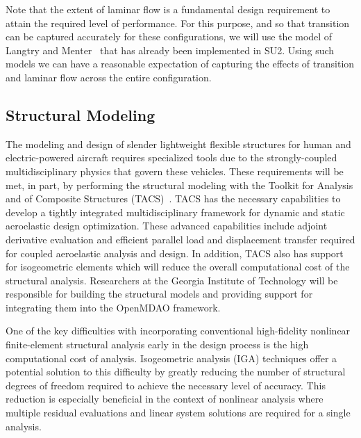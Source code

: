 \documentclass[]{aiaa-tc}
\begin{document}
    Note that the extent of laminar flow is a fundamental design requirement to attain the required level of performance.  For this purpose, and so that transition can be captured accurately for these configurations, we will use the model of Langtry and Menter~\cite{Langtry:Correlation} that has already been implemented in SU2.  Using such models we can have a reasonable expectation of capturing the effects of transition and laminar flow across the entire configuration.          

 
    
        \subsection{Structural Modeling}

The modeling and design of slender lightweight flexible structures for
human and electric-powered aircraft requires specialized tools due to
the strongly-coupled multidisciplinary physics that govern these
vehicles. These requirements will be met, in part, by performing the
structural modeling with the Toolkit for Analysis and of Composite
Structures (TACS)~\cite{Kennedy:2014:TACS,
  Kennedy:2014:tacs-tripan}. TACS has the necessary capabilities to
develop a tightly integrated multidisciplinary framework for dynamic
and static aeroelastic design optimization. These advanced
capabilities include adjoint derivative evaluation and efficient
parallel load and displacement transfer required for coupled
aeroelastic analysis and design.  In addition, TACS also has support
for isogeometric elements which will reduce the overall computational
cost of the structural analysis. Researchers at the Georgia Institute
of Technology will be responsible for building the structural models
and providing support for integrating them into the OpenMDAO
framework.

One of the key difficulties with incorporating conventional
high-fidelity nonlinear finite-element structural analysis early in
the design process is the high computational cost of
analysis. Isogeometric analysis (IGA) techniques offer a potential
solution to this difficulty by greatly reducing the number of
structural degrees of freedom required to achieve the necessary level
of accuracy. This reduction is especially beneficial in the context of
nonlinear analysis where multiple residual evaluations and linear
system solutions are required for a single analysis.
 
\end{document}
